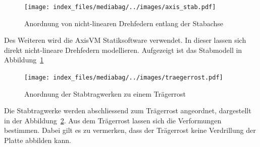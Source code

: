 \documentclass[
  12pt,
  letterpaper,
  egregdoesnotlikesansseriftitles]{scrreprt}
\begin{document}
\begin{figure}[H]

{\centering \texttt{[image: index\_files/mediabag/../images/axis\_stab.pdf]}

}

\caption{\label{fig-axis_stab}Anordnung von nicht-linearen Drehfedern
entlang der Stabachse}

\end{figure}

Des Weiteren wird die AxisVM Statiksoftware verwendet. In dieser lassen
sich direkt nicht-lineare Drehfedern modellieren. Aufgezeigt ist das
Stabmodell in Abbildung~\ref{fig-axis_stab}

\begin{figure}[H]

{\centering \texttt{[image: index\_files/mediabag/../images/traegerrost.pdf]}

}

\caption{\label{fig-traegerrost}Anordnung der Stabtragwerken zu einem
Trägerrost}

\end{figure}

Die Stabtragwerke werden abschliessend zum Trägerrost angeordnet,
dargestellt in der Abbildung~\ref{fig-traegerrost}. Aus dem Trägerrost
lassen sich die Verformungen bestimmen. Dabei gilt es zu vermerken, dass
der Trägerrost keine Verdrillung der Platte abbilden kann.

\newpage{}

\end{document}
